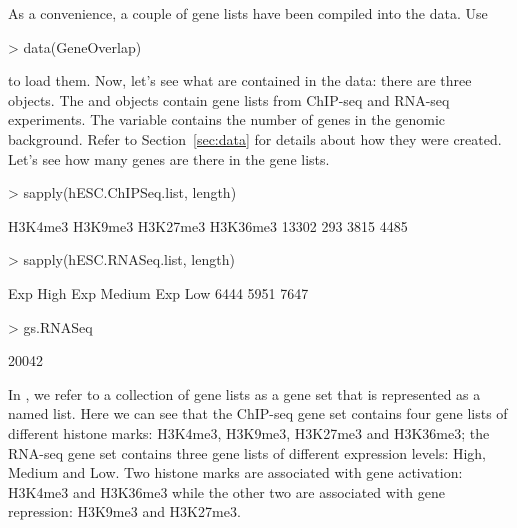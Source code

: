 \documentclass{article}
\begin{document}
As a convenience, a couple of gene lists have been compiled into the  data. Use
\begin{Schunk}
\begin{Sinput}
> data(GeneOverlap)
\end{Sinput}
\end{Schunk}
to load them. Now, let's see what are contained in the data: there are three objects. The  and  objects contain gene lists from ChIP-seq and RNA-seq experiments. The  variable contains the number of genes in the genomic background. Refer to Section~\ref{sec:data} for details about how they were created. Let's see how many genes are there in the gene lists.
\begin{Schunk}
\begin{Sinput}
> sapply(hESC.ChIPSeq.list, length)
\end{Sinput}
\begin{Soutput}
 H3K4me3  H3K9me3 H3K27me3 H3K36me3 
   13302      293     3815     4485 
\end{Soutput}
\begin{Sinput}
> sapply(hESC.RNASeq.list, length)
\end{Sinput}
\begin{Soutput}
  Exp High Exp Medium    Exp Low 
      6444       5951       7647 
\end{Soutput}
\begin{Sinput}
> gs.RNASeq
\end{Sinput}
\begin{Soutput}
[1] 20042
\end{Soutput}
\end{Schunk}
In , we refer to a collection of gene lists as a gene set that is represented as a named list. Here we can see that the ChIP-seq gene set contains four gene lists of different histone marks: H3K4me3, H3K9me3, H3K27me3 and H3K36me3; the RNA-seq gene set contains three gene lists of different expression levels: High, Medium and Low. Two histone marks are associated with gene activation: H3K4me3 and H3K36me3 while the other two are associated with gene repression: H3K9me3 and H3K27me3.
\end{document}
